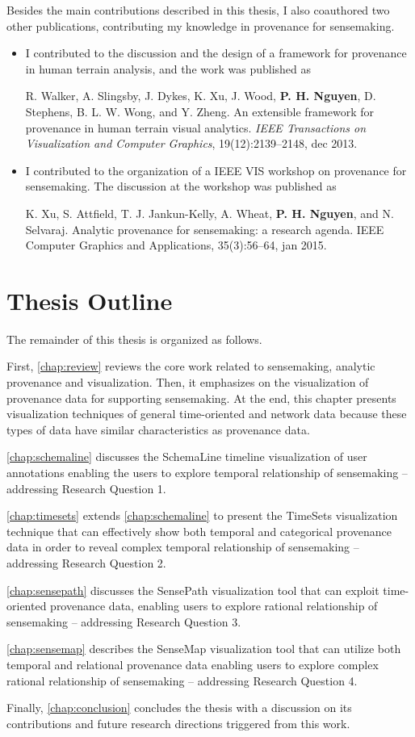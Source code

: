 Besides the main contributions described in this thesis, I also coauthored two other publications, contributing my knowledge in provenance for sensemaking.

\begin{itemize}
	\item I contributed to the discussion and the design of a framework for provenance in human terrain analysis, and the work was published as
	
	R. Walker, A. Slingsby, J. Dykes, K. Xu, J. Wood, \textbf{P. H. Nguyen}, D. Stephens, B. L. W. Wong, and Y. Zheng. An extensible framework for provenance in human terrain visual analytics. \textit{IEEE Transactions on Visualization and Computer Graphics}, 19(12):2139--2148, dec 2013.
	
	\item I contributed to the organization of a IEEE VIS workshop on provenance for sensemaking. The discussion at the workshop was published as
	
	K. Xu, S. Attfield, T. J. Jankun-Kelly, A. Wheat, \textbf{P. H. Nguyen}, and N. Selvaraj. Analytic provenance for sensemaking: a research agenda. IEEE Computer Graphics and Applications, 35(3):56--64, jan 2015.	
\end{itemize}

\section{Thesis Outline} 
The remainder of this thesis is organized as follows.

First, \autoref{chap:review} reviews the core work related to sensemaking, analytic provenance and visualization. Then, it emphasizes on the visualization of provenance data for supporting sensemaking. At the end, this chapter presents visualization techniques of general time-oriented and network data because these types of data have similar characteristics as provenance data.

\autoref{chap:schemaline} discusses the SchemaLine timeline visualization of user annotations enabling the users to explore temporal relationship of sensemaking -- addressing Research Question 1.

\autoref{chap:timesets} extends \autoref{chap:schemaline} to present the TimeSets visualization technique that can effectively show both temporal and categorical provenance data in order to reveal complex temporal relationship of sensemaking -- addressing Research Question 2.

\autoref{chap:sensepath} discusses the SensePath visualization tool that can exploit time-oriented provenance data, enabling users to explore rational relationship of sensemaking -- addressing Research Question 3.

\autoref{chap:sensemap} describes the SenseMap visualization tool that can utilize both temporal and relational provenance data enabling users to explore complex rational relationship of sensemaking -- addressing Research Question 4.

Finally, \autoref{chap:conclusion} concludes the thesis with a discussion on its contributions and future research directions triggered from this work.